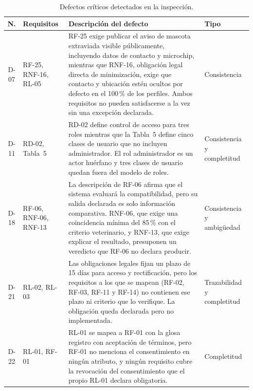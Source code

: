 \documentclass[journal,onecolumn]{IEEEtran}
\begin{document}
	\begin{table}[h!]
		\centering
		\caption{Defectos críticos detectados en la inspección.}
		\label{tab:defectos-criticos}
		\begin{tabular}{
				c
				>{\raggedright\arraybackslash}p{2.3cm}
				>{\raggedright\arraybackslash}p{7.3cm}
				>{\raggedright\arraybackslash}p{2.2cm}
			}
			\toprule
			\textbf{N.\textordmasculine{}} & \textbf{Requisitos} & \textbf{Descripción del defecto} & \textbf{Tipo} \\
			\midrule
			D-07 & RF-25, RNF-16, RL-05 & RF-25 exige publicar el aviso de
			mascota extraviada visible públicamente, incluyendo datos de
			contacto y microchip, mientras que RNF-16, obligación legal directa
			de minimización, exige que contacto y ubicación estén ocultos por
			defecto en el 100\,\% de los perfiles. Ambos requisitos no pueden
			satisfacerse a la vez sin una excepción declarada. & Consistencia \\
			\addlinespace
			D-11 & RD-02, Tabla~5 & RD-02 define control de acceso para tres
			roles mientras que la Tabla~5 define cinco clases de usuario que no
			incluyen administrador. El rol administrador es un actor huérfano y
			tres clases de usuario quedan fuera del modelo de roles. &
			Consistencia y completitud \\
			\addlinespace
			D-18 & RF-06, RNF-06, RNF-13 & La descripción de RF-06 afirma que el
			sistema evaluará la compatibilidad, pero su salida declarada es solo
			información comparativa. RNF-06, que exige una coincidencia mínima
			del 85\,\% con el criterio veterinario, y RNF-13, que exige explicar
			el resultado, presuponen un veredicto que RF-06 no declara producir.
			& Consistencia y ambigüedad \\
			\addlinespace
			D-21 & RL-02, RL-03 & Las obligaciones legales fijan un plazo de 15
			días para acceso y rectificación, pero los requisitos a los que se
			mapean (RF-02, RF-03, RF-11 y RF-14) no contienen ese plazo ni
			criterio que lo verifique. La obligación queda declarada pero no
			implementada. & Trazabilidad y completitud \\
			\addlinespace
			D-22 & RL-01, RF-01 & RL-01 se mapea a RF-01 con la glosa registro
			con aceptación de términos, pero RF-01 no menciona el consentimiento
			en ningún atributo, y ningún requisito cubre la revocación del
			consentimiento que el propio RL-01 declara obligatoria. &
			Completitud \\
			\bottomrule
		\end{tabular}
	\end{table}
	
\end{document}
